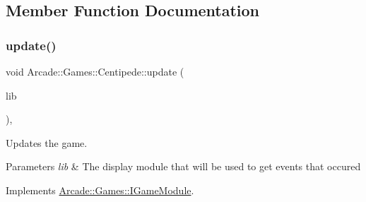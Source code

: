 \subsection{Member Function Documentation}
\mbox{\label{classArcade_1_1Games_1_1Centipede_a11a932a0abda301ae6037c6b97532e79}} 
\subsubsection{\texorpdfstring{update()}{update()}}
{\footnotesize\ttfamily void Arcade\+::\+Games\+::\+Centipede\+::update (\begin{DoxyParamCaption}\item[{const \mbox{\hyperlink{classArcade_1_1Display_1_1IDisplayModule}{Arcade\+::\+Display\+::\+I\+Display\+Module}} \&}]{lib }\end{DoxyParamCaption})\hspace{0.3cm}{\ttfamily [final]}, {\ttfamily [virtual]}}



Updates the game. 


\begin{DoxyParams}{Parameters}
{\em lib} & The display module that will be used to get events that occured \\
\hline
\end{DoxyParams}


Implements \mbox{\hyperlink{classArcade_1_1Games_1_1IGameModule_a421d1064fcc112dfc7ea025fc7f88aa7}{Arcade\+::\+Games\+::\+I\+Game\+Module}}.

